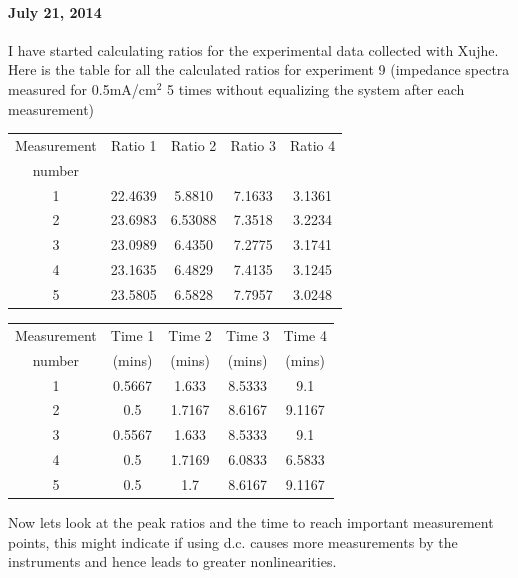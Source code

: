 \documentclass[12pt]{book}
\begin{document}
\paragraph{July 21, 2014}
I have started calculating ratios for the experimental data collected with Xujhe. Here is the table for all the calculated ratios for experiment 9 (impedance spectra measured for 0.5mA/cm$^2$ 5 times without equalizing the system after each measurement)
\begin{center}
	\begin{tabular}{ |c| |c| c| c| c| }
		\hline
		Measurement& Ratio 1 & Ratio 2 & Ratio 3 & Ratio 4 \\
		number &  &  &  &  \\\hline\hline
		1 & 22.4639  & 5.8810   & 7.1633  & 3.1361  \\
		2 & 23.6983 & 6.53088   & 7.3518  & 3.2234  \\
		3 & 23.0989  & 6.4350   & 7.2775  & 3.1741  \\
		4 & 23.1635 & 6.4829 & 7.4135 & 3.1245 \\
		5 & 23.5805 & 6.5828 & 7.7957 & 3.0248 \\\hline
	\end{tabular}
\end{center}
\begin{center}
	\begin{tabular}{ |c| |c| c| c| c| }
		\hline
		Measurement& Time 1 & Time 2 & Time 3 & Time 4 \\
		number & (mins) &  (mins) &  (mins) &  (mins) \\\hline\hline
		1  & 0.5667  & 1.633   & 8.5333  & 9.1  \\
		2  & 0.5  & 1.7167 & 8.6167  & 9.1167 \\
		3 & 0.5567  & 1.633 & 8.5333 & 9.1 \\
		4 & 0.5 & 1.7169 & 6.0833 & 6.5833 \\
		5 & 0.5 & 1.7 & 8.6167 & 9.1167 \\\hline
	\end{tabular}
\end{center}
Now lets look at the peak ratios and the time to reach important measurement points, this might indicate if using d.c. causes more measurements by the instruments and hence leads to greater nonlinearities.
\end{document}
